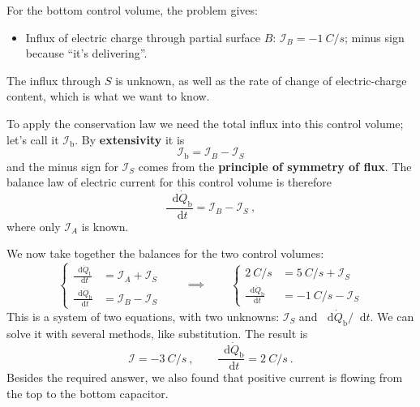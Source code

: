 \documentclass[a4paper,12pt,%
onecolumn,oneside,%
british%
]{memoir}
\newcommand*{\di}{\mathop{}\!\mathrm{d}}%
\renewcommand*{\|}[1][]{\nonscript\:#1\vert\nonscript\:\mathopen{}}
\newcommand*{\dt}{\di t}
\newcommand*{\yQ}{\dot{Q}}%
\newcommand*{\yI}{\mathcal{I}}
\begin{document}
  \smallskip

  For the bottom control volume, the problem gives:
    \begin{itemize}[nosep]
  \item Influx of electric charge through partial surface $B$: $\yI_{B} = -\qty{1}{C/s}$; minus sign because \enquote{it's delivering}.
  \end{itemize}
  The influx through $S$ is unknown, as well as the rate of change of electric-charge content, which is what we want to know.

  To apply the conservation law we need the total influx into this control volume; let's call it $\yI_{\text{b}}$. By \textbf{extensivity} it is
  \begin{equation*}
    \yI_{\text{b}} = \yI_{B} - \yI_{S}
  \end{equation*}
  and the minus sign for $\yI_{S}$ comes from the \textbf{principle of symmetry of flux}.
  The balance law of electric current for this control volume is therefore
  \begin{equation*}
        \frac{\di\yQ_{\text{b}}}{\dt} = \yI_{B} - \yI_{S} \ ,
  \end{equation*}
  where only $\yI_{A}$ is known.

  \smallskip

  We now take together the balances for the two control volumes:
  \begin{equation}\label{eq:approach1}
    \left\{
      \begin{aligned}
        \frac{\di\yQ_{\text{t}}}{\dt} &= \yI_{A} + \yI_{S}
        \\
        \frac{\di\yQ_{\text{b}}}{\dt} &= \yI_{B} - \yI_{S}
      \end{aligned}
    \right.
    \qquad\implies\qquad
    \left\{
      \begin{aligned}
        \qty{2}{C/s} &= \qty{5}{C/s} + \yI_{S}
        \\
        \frac{\di\yQ_{\text{b}}}{\dt} &= -\qty{1}{C/s} - \yI_{S}
      \end{aligned}
    \right.
  \end{equation}
This is a system of two equations, with two unknowns: $\yI_{S}$ and $\di\yQ_{\text{b}}/\dt$. We can solve it with several methods, like substitution. The result is
\begin{equation*}
  \yI = -\qty{3}{C/s} \ ,\qquad \boxed{\frac{\di\yQ_{\text{b}}}{\dt} = \qty{2}{C/s}} \ .
\end{equation*}
Besides the required answer, we also found that positive current is flowing from the top to the bottom capacitor.
\end{document}
